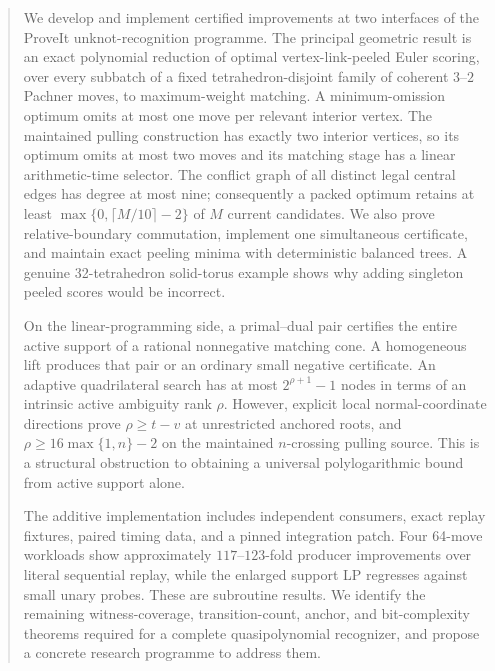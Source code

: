 \begin{abstract}
We develop and implement certified improvements at two interfaces of the
ProveIt unknot-recognition programme. The principal geometric result is an
exact polynomial reduction of optimal vertex-link-peeled Euler scoring,
over every subbatch of a fixed tetrahedron-disjoint family of coherent
$3$--$2$ Pachner moves, to maximum-weight matching. A minimum-omission
optimum omits at most one move per relevant interior vertex. The maintained
pulling construction has exactly two interior vertices, so its optimum
omits at most two moves and its matching stage has a linear arithmetic-time
selector.
The conflict graph of all distinct legal central edges has degree at most
nine; consequently a packed optimum retains at least
$\max\{0,\lceil M/10\rceil-2\}$ of $M$ current candidates. We also prove
relative-boundary commutation, implement one simultaneous certificate, and
maintain exact peeling minima with deterministic balanced trees. A genuine
32-tetrahedron solid-torus example shows why adding singleton peeled scores
would be incorrect.

On the linear-programming side, a primal--dual pair certifies the entire
active support of a rational nonnegative matching cone. A homogeneous lift
produces that pair or an ordinary small negative certificate. An adaptive
quadrilateral search has at most $2^{\rho+1}-1$ nodes in terms of an intrinsic
active ambiguity rank $\rho$. However, explicit local normal-coordinate
directions prove $\rho\ge t-v$ at unrestricted anchored roots, and
$\rho\ge16\max\{1,n\}-2$ on the maintained $n$-crossing pulling source.
This is a structural obstruction to obtaining a universal polylogarithmic
bound from active support alone.

The additive implementation includes independent consumers, exact replay
fixtures, paired timing data, and a pinned integration patch. Four
64-move workloads show approximately $117$--$123$-fold producer improvements
over literal sequential replay, while the enlarged support LP regresses
against small unary probes. These are subroutine results. We identify the
remaining witness-coverage, transition-count, anchor, and bit-complexity
theorems required for a complete quasipolynomial recognizer, and propose a
concrete research programme to address them.
\end{abstract}

